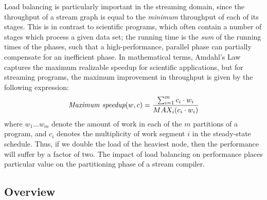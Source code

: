 Load balancing is particularly important in the streaming domain,
since the throughput of a stream graph is equal to the {\it minimum}
throughput of each of its stages.  This is in contrast to scientific
programs, which often contain a number of stages which process a given
data set; the running time is the {\it sum} of the running times of
the phases, such that a high-performance, parallel phase can partially
compensate for an inefficient phase.  In mathematical terms, Amdahl's
Law captures the maximum realizable speedup for scientific
applications, but for streaming programs, the maximum improvement in
throughput is given by the following expression:
\begin{align*}
\mbox{\it Maximum speedup}(w, c) = \frac{\sum_{i=1}^m{c_i \cdot w_i}}{MAX_i(c_i \cdot w_i)}
\end{align*}
where $w_1 \dots w_m$ denote the amount of work in each of the $m$
partitions of a program, and $c_i$ denotes the multiplicity of work
segment $i$ in the steady-state schedule.  Thus, if we double the load
of the heaviest node, then the performance will suffer by a factor of
two.  The impact of load balancing on performance places particular
value on the partitioning phase of a stream compiler.

\subsection{Overview}

